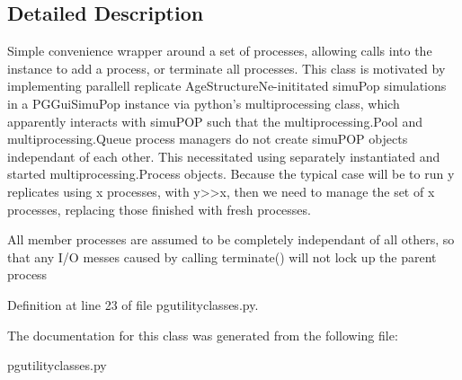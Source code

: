 \subsection{Detailed Description}
\begin{DoxyVerb}Simple convenience wrapper around a set of processes,
allowing calls into the instance to add a process,
or terminate all processes. This class is motivated
by implementing parallell replicate AgeStructureNe-inititated
simuPop simulations in a PGGuiSimuPop instance via
python's multiprocessing class, which apparently interacts
with simuPOP such that the multiprocessing.Pool and 
multiprocessing.Queue process managers do not create
simuPOP objects independant of each other.  This
necessitated using separately instantiated and started
multiprocessing.Process objects.  Because the typical
case will be to run y replicates using x processes, with
y>>x, then we need to manage the set of x processes, replacing
those finished with fresh processes.

All member processes are assumed to be completely 
independant of all others, so that any I/O messes 
caused by calling terminate() will not lock up 
the parent process
\end{DoxyVerb}
 

Definition at line 23 of file pgutilityclasses.\+py.



The documentation for this class was generated from the following file\+:\begin{DoxyCompactItemize}
\item 
pgutilityclasses.\+py\end{DoxyCompactItemize}
